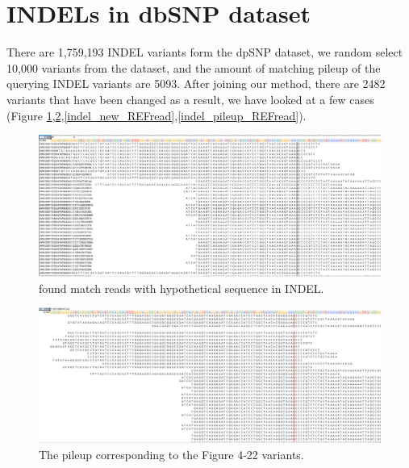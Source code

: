 \section{INDELs in dbSNP dataset}

There are 1,759,193 INDEL variants form the dpSNP dataset, we random select 10,000 variants from the dataset, and the amount of matching pileup of the querying INDEL variants are 5093. After joining our method, there are 2482 variants that have been changed as a result, we have looked at a few cases  (Figure \ref{indel_new_ALTread},\ref{indel_pileup_ALTread},\ref{indel_new_REFread},\ref{indel_pileup_REFread}).

\vspace{1cm}
\begin{figure}[H]
    \centering
    \includegraphics[width=1\columnwidth]{body/image/indel_new_ALTread.png}
    \captionsetup{labelfont=bf}
    \renewcommand{\baselinestretch}{1.0}
    \vspace{-1cm}
    \caption[INDEL match reads]{ found match reads with hypothetical sequence in INDEL.}
    \label{indel_new_ALTread}
\end{figure}

\vspace{0.5cm}
\begin{figure}[H]
    \centering
    \includegraphics[width=1\columnwidth]{body/image/indel_pileup_ALTread.png}
    \captionsetup{labelfont=bf}
    \renewcommand{\baselinestretch}{1.0}
    \vspace{-1cm}
    \caption[Figure 4.22 pileup]{ The pileup corresponding to the Figure 4-22 variants.}
    \label{indel_pileup_ALTread}
\end{figure}

